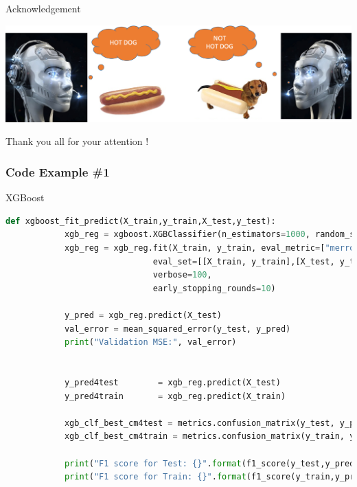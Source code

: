 \documentclass{if-beamer}
\begin{document}
  
\begin{frame}{Acknowledgement}    
 
   \centering \includegraphics[scale=0.3]{./figs/hotdog.png}
 

  \centering  \Huge Thank you all for your attention !
 
  \end{frame}




   

\begin{frame}[fragile]
\frametitle{Code Example \#1}


 \begin{exampleblock}{XGBoost}
 
      \begin{lstlisting}[language=Python]
      def xgboost_fit_predict(X_train,y_train,X_test,y_test):
            xgb_reg = xgboost.XGBClassifier(n_estimators=1000, random_state=42)
            xgb_reg = xgb_reg.fit(X_train, y_train, eval_metric=["merror"],
                              eval_set=[[X_train, y_train],[X_test, y_test]],
                              verbose=100,
                              early_stopping_rounds=10)
            
            y_pred = xgb_reg.predict(X_test)
            val_error = mean_squared_error(y_test, y_pred)
            print("Validation MSE:", val_error) 
            
            
            y_pred4test        = xgb_reg.predict(X_test)
            y_pred4train       = xgb_reg.predict(X_train)
            
            xgb_clf_best_cm4test = metrics.confusion_matrix(y_test, y_pred4test)
            xgb_clf_best_cm4train = metrics.confusion_matrix(y_train, y_pred4train)
            
            print("F1 score for Test: {}".format(f1_score(y_test,y_pred4test, average='weighted')))
            print("F1 score for Train: {}".format(f1_score(y_train,y_pred4train, average='weighted'))) 
            
      \end{lstlisting}
 \end{exampleblock}


\end{frame}
\end{document}

